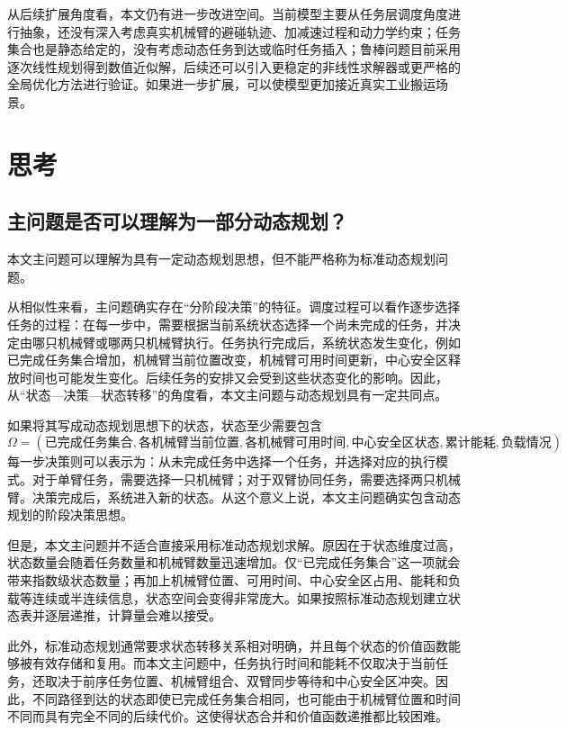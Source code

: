 从后续扩展角度看，本文仍有进一步改进空间。当前模型主要从任务层调度角度进行抽象，还没有深入考虑真实机械臂的避碰轨迹、加减速过程和动力学约束；任务集合也是静态给定的，没有考虑动态任务到达或临时任务插入；鲁棒问题目前采用逐次线性规划得到数值近似解，后续还可以引入更稳定的非线性求解器或更严格的全局优化方法进行验证。如果进一步扩展，可以使模型更加接近真实工业搬运场景。

\section{思考}

\subsection{主问题是否可以理解为一部分动态规划？}

本文主问题可以理解为具有一定动态规划思想，但不能严格称为标准动态规划问题。

从相似性来看，主问题确实存在“分阶段决策”的特征。调度过程可以看作逐步选择任务的过程：在每一步中，需要根据当前系统状态选择一个尚未完成的任务，并决定由哪只机械臂或哪两只机械臂执行。任务执行完成后，系统状态发生变化，例如已完成任务集合增加，机械臂当前位置改变，机械臂可用时间更新，中心安全区释放时间也可能发生变化。后续任务的安排又会受到这些状态变化的影响。因此，从“状态—决策—状态转移”的角度看，本文主问题与动态规划具有一定共同点。

如果将其写成动态规划思想下的状态，状态至少需要包含
\[
\Omega=
(\text{已完成任务集合},
\text{各机械臂当前位置},
\text{各机械臂可用时间},
\text{中心安全区状态},
\text{累计能耗},
\text{负载情况})。
\]
每一步决策则可以表示为：从未完成任务中选择一个任务，并选择对应的执行模式。对于单臂任务，需要选择一只机械臂；对于双臂协同任务，需要选择两只机械臂。决策完成后，系统进入新的状态。从这个意义上说，本文主问题确实包含动态规划的阶段决策思想。

但是，本文主问题并不适合直接采用标准动态规划求解。原因在于状态维度过高，状态数量会随着任务数量和机械臂数量迅速增加。仅“已完成任务集合”这一项就会带来指数级状态数量；再加上机械臂位置、可用时间、中心安全区占用、能耗和负载等连续或半连续信息，状态空间会变得非常庞大。如果按照标准动态规划建立状态表并逐层递推，计算量会难以接受。

此外，标准动态规划通常要求状态转移关系相对明确，并且每个状态的价值函数能够被有效存储和复用。而本文主问题中，任务执行时间和能耗不仅取决于当前任务，还取决于前序任务位置、机械臂组合、双臂同步等待和中心安全区冲突。因此，不同路径到达的状态即使已完成任务集合相同，也可能由于机械臂位置和时间不同而具有完全不同的后续代价。这使得状态合并和价值函数递推都比较困难。

